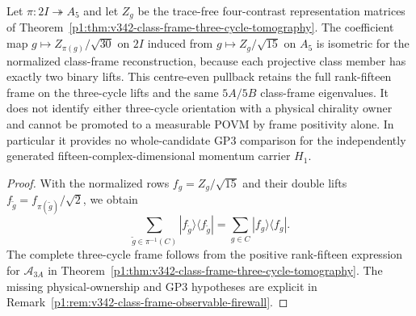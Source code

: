 \documentclass[11pt,a4paper]{article}
\begin{document}
\begin{proposition}
\label{p2f:prop:v342-class-frame-descent-scope}
Let $\pi:2I\twoheadrightarrow A_5$ and let $Z_g$ be the
trace-free four-contrast representation matrices of
Theorem~\ref{p1:thm:v342-class-frame-three-cycle-tomography}.
The coefficient map $g\mapsto Z_{\pi(g)}/\sqrt{30}$ on $2I$
induced from $g\mapsto Z_g/\sqrt{15}$ on $A_5$ is isometric
for the normalized class-frame reconstruction, because each
projective class member has exactly two binary lifts.  This
centre-even pullback retains the full rank-fifteen frame on the
three-cycle lifts and the same $5A/5B$ class-frame eigenvalues.
It does not identify either three-cycle orientation with a
physical chirality owner and cannot be promoted to a measurable
POVM by frame positivity alone.  In particular it provides no
whole-candidate GP3 comparison for the independently generated
fifteen-complex-dimensional momentum carrier $H_1$.
\end{proposition}
\begin{proof}
With the normalized rows $f_g=Z_g/\sqrt{15}$ and their double lifts
$f_{\widetilde g}=f_{\pi(\widetilde g)}/\sqrt2$, we obtain
\[
\sum_{\widetilde g\in\pi^{-1}(C)}
 |f_{\widetilde g}\rangle\langle f_{\widetilde g}|
 =\sum_{g\in C}|f_g\rangle\langle f_g|.
\]
The complete three-cycle frame follows from the positive
rank-fifteen expression for $\mathcal A_{3A}$ in
Theorem~\ref{p1:thm:v342-class-frame-three-cycle-tomography}.
The missing physical-ownership and GP3 hypotheses are explicit
in Remark~\ref{p1:rem:v342-class-frame-observable-firewall}.
\end{proof}
\end{document}
